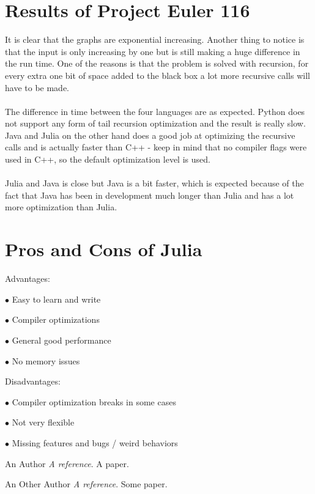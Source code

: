\documentclass[landscape, a0]{sciposter}
\begin{document}
\begin{multicols}{3}
\section{Results of Project Euler 116}
It is clear that the graphs are exponential increasing. Another thing to notice is that the input is only increasing by one but is still making a huge difference in the run time. One of the reasons is that the problem is solved with recursion, for every extra one bit of space added to the black box a lot more recursive calls will have to be made.\\
\\
The difference in time between the four languages are as expected. Python does not support any form of tail recursion optimization and the result is really slow. Java and Julia on the other hand does a good job at optimizing the recursive calls and is actually faster than C++ - keep in mind that no compiler flags were used in C++, so the default optimization level is used.\\
\\
Julia and Java is close but Java is a bit faster, which is expected because of the fact that Java has been in development much longer than Julia and has a lot more optimization than Julia.

\section{Pros and Cons of Julia}
\begin{list}{}{}
	\item Advantages:
	\item[$\bullet$] Easy to learn and write
	\item[$\bullet$] Compiler optimizations
	\item[$\bullet$] General good performance
	\item[$\bullet$] No memory issues
\end{list}
\begin{list}{}{}
	\item Disadvantages:
	\item[$\bullet$] Compiler optimization breaks in some cases
	\item[$\bullet$] Not very flexible
	\item[$\bullet$] Missing features and bugs / weird behaviors
\end{list}


\begin{thebibliography}{m}

An Author
{\em A reference}.
A paper.

An Other Author
{\em A reference}.
Some paper.


\end{thebibliography}


\end{multicols}
\end{document}
